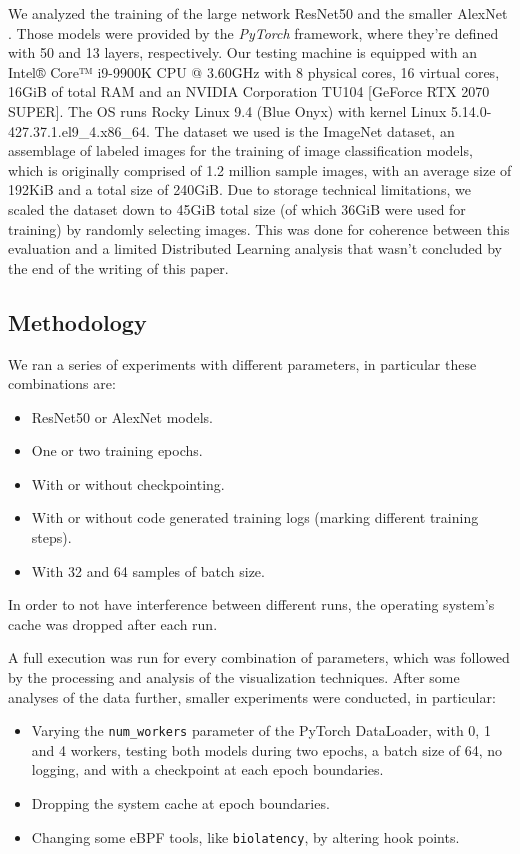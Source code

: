 \documentclass[conference]{IEEEtran}
\begin{document}
We analyzed the training of the large network ResNet50 \cite{resnet50} and the smaller AlexNet \cite{alexnet}. Those models were
provided by the \textit{PyTorch} framework, where they're defined with 50 and 13 layers, respectively. Our testing machine is equipped with an Intel® Core™ i9-9900K CPU @ 3.60GHz with
8 physical cores, 16 virtual cores, 16GiB of total RAM and an NVIDIA Corporation TU104 [GeForce RTX 2070 SUPER]. The OS runs Rocky Linux 9.4 (Blue Onyx) with kernel Linux 5.14.0-427.37.1.el9\_4.x86\_64. The dataset we used is the ImageNet \cite{imagenet} dataset, an assemblage of labeled images for the training of image classification models, which is originally comprised of 1.2 million sample images, with an average size of 192KiB and a total size of 240GiB. Due to storage technical limitations, we scaled the dataset down to 45GiB total size (of which 36GiB were used for training) by randomly selecting images. This was done for coherence between this evaluation and a limited Distributed Learning analysis that wasn't concluded by the end of the writing of this paper.

\subsection{Methodology}

We ran a series of experiments with different parameters, in particular these combinations are:
\begin{itemize}
	\item ResNet50 or AlexNet models.
	\item One or two training epochs.
	\item With or without checkpointing.
	\item With or without code generated training logs (marking different training steps).
	\item With 32 and 64 samples of batch size.
\end{itemize}
In order to not have interference between different runs, the operating system's cache was dropped after each run.

A full execution was run for every combination of parameters, which was followed by the processing and analysis of the visualization techniques.
After some analyses of the data further, smaller experiments were conducted, in particular:
\begin{itemize}
	\item Varying the \texttt{num\_workers} parameter of the PyTorch DataLoader, with 0, 1 and 4 workers, testing both models during two epochs, a batch size of 64, no logging, and with a checkpoint at each epoch boundaries.
	\item Dropping the system cache at epoch boundaries.
	\item Changing some eBPF tools, like \texttt{biolatency}, by altering hook points.
\end{itemize}
\end{document}
